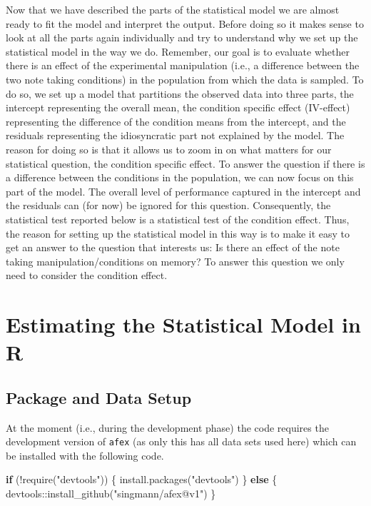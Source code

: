 \documentclass[
]{book}
\newenvironment{Shaded}{\begin{snugshade}}{\end{snugshade}}
\newcommand{\ControlFlowTok}[1]{\textcolor[rgb]{0.13,0.29,0.53}{\textbf{#1}}}
\newcommand{\FunctionTok}[1]{\textcolor[rgb]{0.00,0.00,0.00}{#1}}
\newcommand{\NormalTok}[1]{#1}
\newcommand{\SpecialCharTok}[1]{\textcolor[rgb]{0.00,0.00,0.00}{#1}}
\newcommand{\StringTok}[1]{\textcolor[rgb]{0.31,0.60,0.02}{#1}}
\begin{document}
Now that we have described the parts of the statistical model we are almost ready to fit the model and interpret the output. Before doing so it makes sense to look at all the parts again individually and try to understand why we set up the statistical model in the way we do. Remember, our goal is to evaluate whether there is an effect of the experimental manipulation (i.e., a difference between the two note taking conditions) in the population from which the data is sampled. To do so, we set up a model that partitions the observed data into three parts, the intercept representing the overall mean, the condition specific effect (IV-effect) representing the difference of the condition means from the intercept, and the residuals representing the idiosyncratic part not explained by the model. The reason for doing so is that it allows us to zoom in on what matters for our statistical question, the condition specific effect. To answer the question if there is a difference between the conditions in the population, we can now focus on this part of the model. The overall level of performance captured in the intercept and the residuals can (for now) be ignored for this question. Consequently, the statistical test reported below is a statistical test of the condition effect. Thus, the reason for setting up the statistical model in this way is to make it easy to get an answer to the question that interests us: Is there an effect of the note taking manipulation/conditions on memory? To answer this question we only need to consider the condition effect.

\hypertarget{estimating-the-statistical-model-in-r}{%
\section{Estimating the Statistical Model in R}\label{estimating-the-statistical-model-in-r}}

\hypertarget{package-and-data-setup}{%
\subsection{Package and Data Setup}\label{package-and-data-setup}}

At the moment (i.e., during the development phase) the code requires the development version of \texttt{afex} (as only this has all data sets used here) which can be installed with the following code.

\begin{Shaded}
\begin{Highlighting}[]
\ControlFlowTok{if}\NormalTok{ (}\SpecialCharTok{!}\FunctionTok{require}\NormalTok{(}\StringTok{"devtools"}\NormalTok{)) \{}
  \FunctionTok{install.packages}\NormalTok{(}\StringTok{"devtools"}\NormalTok{)}
\NormalTok{\} }\ControlFlowTok{else}\NormalTok{ \{}
\NormalTok{  devtools}\SpecialCharTok{::}\FunctionTok{install\_github}\NormalTok{(}\StringTok{"singmann/afex@v1"}\NormalTok{)}
\NormalTok{\}}
\end{Highlighting}
\end{Shaded}
\end{document}
